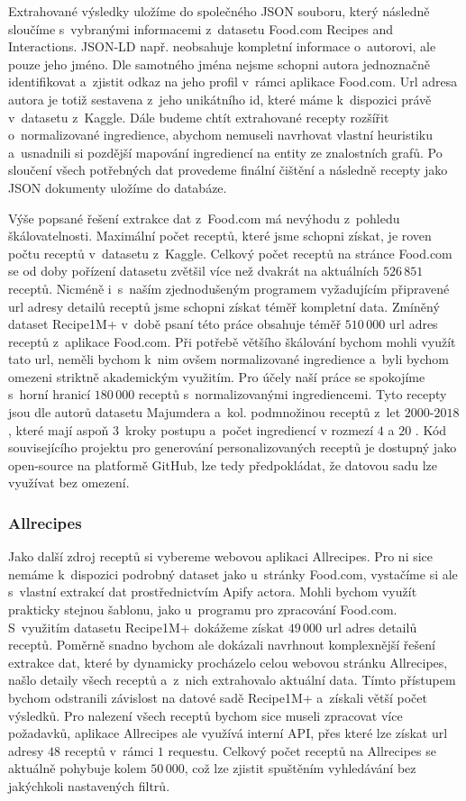 Extrahované výsledky uložíme do společného JSON souboru, který následně sloučíme s~vybranými informacemi z~datasetu Food.com Recipes and Interactions. JSON-LD např. neobsahuje kompletní informace o~autorovi, ale pouze jeho jméno. Dle samotného jména nejsme schopni autora jednoznačně identifikovat a~zjistit odkaz na jeho profil v~rámci aplikace Food.com. Url adresa autora je totiž sestavena z~jeho unikátního id, které máme k~dispozici právě v~datasetu z~Kaggle. Dále budeme chtít extrahované recepty rozšířit o~normalizované ingredience, abychom nemuseli navrhovat vlastní heuristiku a~usnadnili si pozdější mapování ingrediencí na entity ze znalostních grafů. Po sloučení všech potřebných dat provedeme finální čištění a následně recepty jako JSON dokumenty uložíme do databáze.

Výše popsané řešení extrakce dat z~Food.com má nevýhodu z~pohledu škálovatelnosti. Maximální počet receptů, které jsme schopni získat, je roven počtu receptů v~datasetu z~Kaggle. Celkový počet receptů na stránce Food.com se od doby pořízení datasetu zvětšil více než dvakrát na aktuálních $526\,851$ receptů. Nicméně i~s~naším zjednodušeným programem vyžadujícím připravené url adresy detailů receptů jsme schopni získat téměř kompletní data. Zmíněný dataset Recipe1M+ v~době psaní této práce obsahuje téměř $510\,000$ url adres receptů z~aplikace Food.com. Při potřebě většího škálování bychom mohli využít tato url, neměli bychom k~nim ovšem normalizované ingredience a~byli bychom omezeni striktně akademickým využitím. Pro účely naší práce se spokojíme s~horní hranicí $180\,000$ receptů s~normalizovanými ingrediencemi. Tyto recepty jsou dle autorů datasetu Majumdera a~kol. podmnožinou receptů z~let $2000$-$2018$, které mají aspoň $3$~kroky postupu a~počet ingrediencí v rozmezí $4$ a $20$ \citep{majumder-etal-2019-generating}. Kód souvisejícího projektu pro generování personalizovaných receptů je dostupný jako open-source na platformě GitHub, lze tedy předpokládat, že datovou sadu lze využívat bez omezení.

\subsubsection{Allrecipes}

Jako další zdroj receptů si vybereme webovou aplikaci Allrecipes. Pro ni sice nemáme k~dispozici podrobný dataset jako u~stránky Food.com, vystačíme si ale s~vlastní extrakcí dat prostřednictvím Apify actora. Mohli bychom využít prakticky stejnou šablonu, jako u~programu pro zpracování Food.com. S~využitím datasetu Recipe1M+ dokážeme získat $49\,000$ url adres detailů receptů. Poměrně snadno bychom ale dokázali navrhnout komplexnější řešení extrakce dat, které by dynamicky procházelo celou webovou stránku Allrecipes, našlo detaily všech receptů a~z~nich extrahovalo aktuální data. Tímto přístupem bychom odstranili závislost na datové sadě Recipe1M+ a~získali větší počet výsledků. Pro nalezení všech receptů bychom sice museli zpracovat více požadavků, aplikace Allrecipes ale využívá interní API, přes které lze získat url adresy $48$ receptů v~rámci $1$ requestu. Celkový počet receptů na Allrecipes se aktuálně pohybuje kolem $50\,000$, což lze zjistit spuštěním vyhledávání bez jakýchkoli nastavených filtrů.

